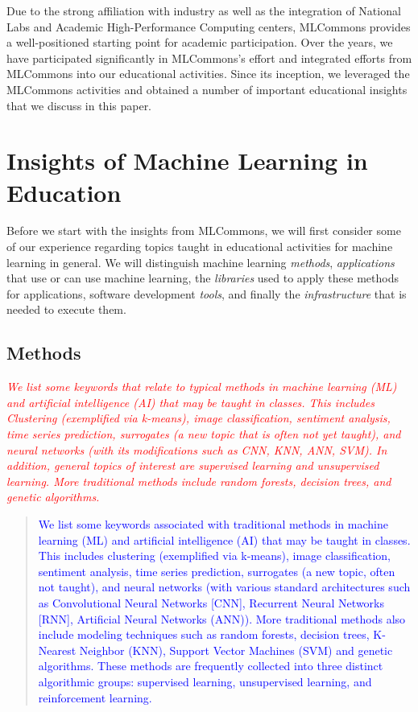\documentclass[utf8]{FrontiersinVancouver} %
\newcommand{\REPLACE}[2]{\textcolor{red}{\it #1} \begin{quote}\textcolor{blue}{#2}\end{quote}}
\begin{document}
Due to the strong affiliation with industry as well as the integration
of National Labs and Academic High-Performance Computing centers,
MLCommons provides a well-positioned starting point for academic
participation. Over the years, we have participated significantly
in MLCommons's effort and integrated efforts from MLCommons into our
educational activities. Since its inception, we leveraged the
MLCommons activities and obtained a number of important educational insights
that we discuss in this paper.



\section{Insights of Machine Learning in Education}
\label{sec:edu-ml}

Before we start with the insights from MLCommons, we will first
consider some of our experience regarding topics taught in educational
activities for machine learning in general. We will distinguish machine
learning {\em methods}, {\em applications} that use or can use machine
learning, the {\em libraries} used to apply these methods for
applications, software development {\em tools}, and finally the
{\em infrastructure} that is needed to execute them.

\subsection{Methods}

\REPLACE{
We list some keywords that relate to typical methods in machine
learning (ML) and artificial intelligence (AI) that may be taught in
classes. This includes Clustering (exemplified via k-means), image
classification, sentiment analysis, time series prediction, surrogates
(a new topic that is often not yet taught), and neural networks (with
its modifications such as CNN, KNN, ANN, SVM).  In addition, general
topics of interest are supervised learning and unsupervised learning.
More traditional methods include random forests, decision trees, and
genetic algorithms.
}{
We list some keywords associated with traditional methods in machine
learning (ML) and artificial intelligence (AI) that may be taught in
classes. This includes clustering (exemplified via k-means), image
classification, sentiment analysis, time series prediction, surrogates
(a new topic, often not taught), and neural networks (with
various standard architectures such as Convolutional Neural Networks [CNN],
Recurrent Neural Networks [RNN], Artificial Neural Networks (ANN)).
More traditional methods also include modeling techniques such as random
forests, decision trees, K-Nearest Neighbor (KNN), Support Vector Machines
(SVM) and genetic algorithms.  These methods are frequently collected into
three distinct algorithmic groups: supervised learning, unsupervised
learning, and reinforcement learning.
}
\end{document}
